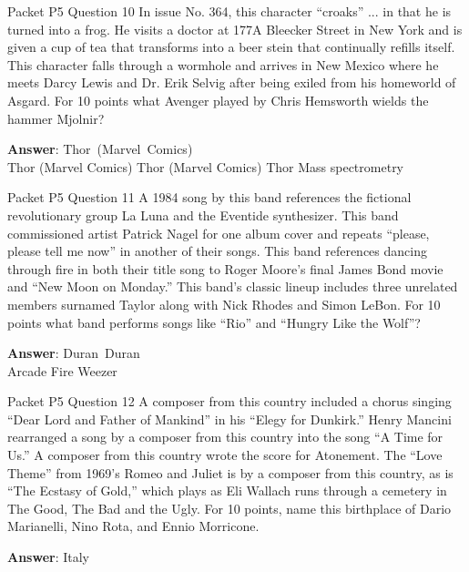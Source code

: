 \begin{frame}{Packet P5 Question 10}
In issue No. 364, this character ``croaks'' ... in that he is turned into a frog. He visits a doctor at 177A Bleecker Street in New York and is given a cup of tea that transforms into a beer stein that continually refills itself. This character falls through a wormhole and arrives in New Mexico where he meets Darcy Lewis and Dr. Erik Selvig after being exiled from his homeworld of Asgard. For 10 points what Avenger played by Chris Hemsworth wields the hammer Mjolnir?        

\textbf{Answer}: Thor\ (Marvel\ Comics)\\
 Thor (Marvel Comics)
 Thor (Marvel Comics)
 Thor
 Mass spectrometry
\end{frame}

\begin{frame}{Packet P5 Question 11}
A 1984 song by this band references the fictional revolutionary group La Luna and the Eventide synthesizer. This band commissioned artist Patrick Nagel for one album cover and repeats “please, please tell me now” in another of their songs. This band references dancing through fire in both their title song to Roger Moore’s final James Bond movie and “New Moon on     Monday.” This band’s classic lineup includes three unrelated members surnamed Taylor along with Nick Rhodes and Simon LeBon. For 10 points what band performs songs like “Rio” and “Hungry Like the Wolf”?    

\textbf{Answer}: Duran\ Duran\\
 Arcade Fire
 Weezer
\end{frame}

\begin{frame}{Packet P5 Question 12}
A composer from this country included a chorus singing “Dear Lord   and Father of Mankind” in his “Elegy for Dunkirk.” Henry Mancini rearranged a song by a composer from this country into the song “A Time for Us.” A composer from this country wrote the score for Atonement. The “Love Theme” from 1969’s Romeo and Juliet is by   a composer from this country, as is “The Ecstasy of Gold,”   which plays as Eli Wallach runs through a cemetery in The Good, The Bad and the Ugly. For 10 points,   name this birthplace of Dario Marianelli, Nino Rota, and Ennio Morricone.

\textbf{Answer}: Italy\\
\end{frame}

